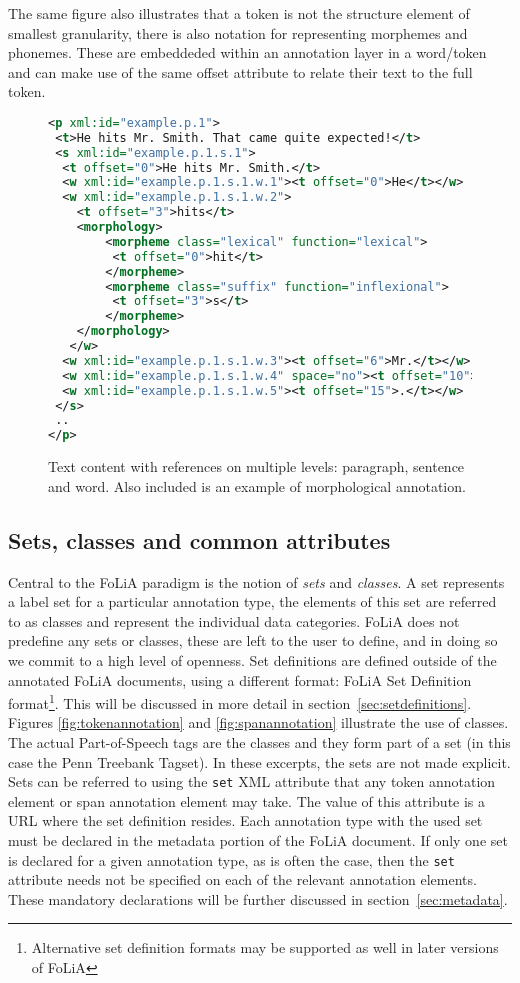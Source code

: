\documentclass[a4paper,10pt,twoside]{article}
\begin{document}
The same figure also illustrates that a token is not the structure element of
smallest granularity, there is also notation for representing morphemes and
phonemes. These are embeddeded within an annotation layer in a word/token and
can make use of the same offset attribute to relate their text to the full token.

\begin{figure}[tbh]

\label{fig:textcontent}
\begin{lstlisting}[language=xml]
<p xml:id="example.p.1">
 <t>He hits Mr. Smith. That came quite expected!</t>
 <s xml:id="example.p.1.s.1">
  <t offset="0">He hits Mr. Smith.</t>
  <w xml:id="example.p.1.s.1.w.1"><t offset="0">He</t></w>
  <w xml:id="example.p.1.s.1.w.2">
    <t offset="3">hits</t>
    <morphology> 
        <morpheme class="lexical" function="lexical">
         <t offset="0">hit</t>
        </morpheme>
        <morpheme class="suffix" function="inflexional">
         <t offset="3">s</t>
        </morpheme>
    </morphology>
   </w>
  <w xml:id="example.p.1.s.1.w.3"><t offset="6">Mr.</t></w>
  <w xml:id="example.p.1.s.1.w.4" space="no"><t offset="10">Smith</t></w>
  <w xml:id="example.p.1.s.1.w.5"><t offset="15">.</t></w>
 </s>
 ..
</p>
\end{lstlisting}
\caption{Text content with references on multiple levels: paragraph, sentence
and word. Also included is an example of morphological annotation.}
\end{figure}


\subsection{Sets, classes and common attributes}

Central to the FoLiA paradigm is the notion of \emph{sets} and \emph{classes}.
A set represents a label set for a particular annotation type, the elements of
this set are referred to as classes and represent the individual data
categories. FoLiA does not predefine any sets or classes, these are left to the
user to define, and in doing so we commit to a high level of openness. Set
definitions are defined outside of the annotated FoLiA documents, using a
different format: FoLiA Set Definition format\footnote{Alternative set
definition formats may be supported as well in later versions of FoLiA}. This
will be discussed in more detail in section~\ref{sec:setdefinitions}. Figures
\ref{fig:tokenannotation} and \ref{fig:spanannotation} illustrate the use of
classes. The actual Part-of-Speech tags are the classes and they form part of a
set (in this case the Penn Treebank Tagset). In these excerpts, the sets are
not made explicit. Sets can be referred to using the \texttt{set} XML attribute
that any token annotation element or span annotation element may take. The
value of this attribute is a URL where the set definition resides. Each
annotation type with the used set must be declared in the metadata portion of
the FoLiA document. If only one set is declared for a given annotation type, as
is often the case, then the \texttt{set} attribute needs not be specified on
each of the relevant annotation elements. These mandatory declarations will be
further discussed in section~\ref{sec:metadata}. 
\end{document}
